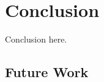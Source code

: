 
\chapter{Conclusion}
\label{chp:conclusion}

Conclusion here.

\section{Future Work}
\label{sec:future_work}
